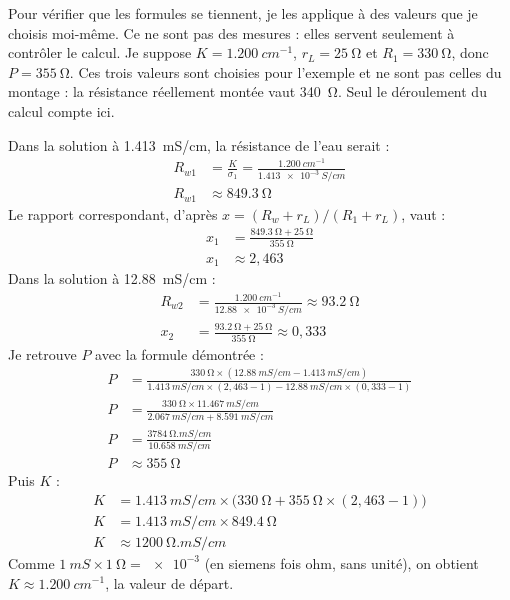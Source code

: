 Pour vérifier que les formules se tiennent, je les applique à des valeurs que je choisis moi-même. Ce ne sont pas des mesures : elles servent seulement à contrôler le calcul. Je suppose $K = \qty{1,200}{cm^{-1}}$, $r_L = \qty{25}{\ohm}$ et $R_1 = \qty{330}{\ohm}$, donc $P = \qty{355}{\ohm}$. Ces trois valeurs sont choisies pour l'exemple et ne sont pas celles du montage : la résistance réellement montée vaut \qty{340}{\ohm}. Seul le déroulement du calcul compte ici.

\begin{exemple}
Dans la solution à \qty{1,413}{mS/cm}, la résistance de l'eau serait :
\begin{align*}
R_{w1} &= \frac{K}{\sigma_1} = \frac{\qty{1,200}{cm^{-1}}}{\qty{1,413e-3}{S/cm}}\\
R_{w1} &\approx \qty{849,3}{\ohm}
\end{align*}
Le rapport correspondant, d'après $x = (R_w + r_L)/(R_1 + r_L)$, vaut :
\begin{align*}
x_1 &= \frac{\qty{849,3}{\ohm} + \qty{25}{\ohm}}{\qty{355}{\ohm}}\\
x_1 &\approx 2{,}463
\end{align*}
Dans la solution à \qty{12,88}{mS/cm} :
\begin{align*}
R_{w2} &= \frac{\qty{1,200}{cm^{-1}}}{\qty{12,88e-3}{S/cm}} \approx \qty{93,2}{\ohm}\\
x_2 &= \frac{\qty{93,2}{\ohm} + \qty{25}{\ohm}}{\qty{355}{\ohm}} \approx 0{,}333
\end{align*}
Je retrouve $P$ avec la formule démontrée :
\begin{align*}
P &= \frac{\qty{330}{\ohm}\times(\qty{12,88}{mS/cm} - \qty{1,413}{mS/cm})}{\qty{1,413}{mS/cm}\times(2{,}463 - 1) - \qty{12,88}{mS/cm}\times(0{,}333 - 1)}\\
P &= \frac{\qty{330}{\ohm}\times\qty{11,467}{mS/cm}}{\qty{2,067}{mS/cm} + \qty{8,591}{mS/cm}}\\
P &= \frac{\qty{3784}{\ohm.mS/cm}}{\qty{10,658}{mS/cm}}\\
P &\approx \qty{355}{\ohm}
\end{align*}
Puis $K$ :
\begin{align*}
K &= \qty{1,413}{mS/cm}\times\bigl(\qty{330}{\ohm} + \qty{355}{\ohm}\times(2{,}463 - 1)\bigr)\\
K &= \qty{1,413}{mS/cm}\times\qty{849,4}{\ohm}\\
K &\approx \qty{1200}{\ohm.mS/cm}
\end{align*}
Comme $\qty{1}{mS}\times\qty{1}{\ohm} = \num{e-3}$ (en siemens fois ohm, sans unité), on obtient $K \approx \qty{1,200}{cm^{-1}}$, la valeur de départ.


\end{exemple}
